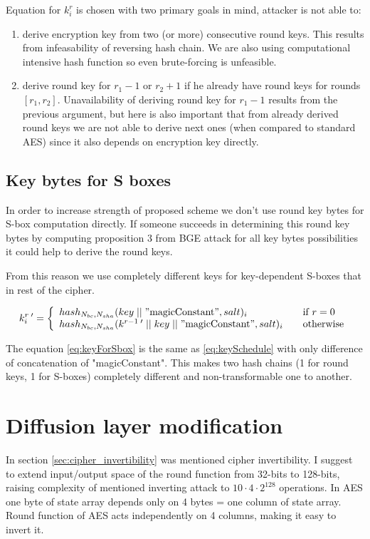 \documentclass[11pt,oneside,final]{fithesis2}
\begin{document}
    Equation for $k_i^r$ is chosen with two primary goals in mind, attacker is not able to:
    \begin{enumerate}
     \item derive encryption key from two (or more) consecutive round keys. This results from infeasability of reversing hash chain. 
	We are also using computational intensive hash function so even brute-forcing is unfeasible.
     \item derive round key for $r_1-1$ or $r_2+1$ if he already have round keys for rounds $[r_1, r_2]$. Unavailability of deriving 
	round key for $r_1-1$ results from the previous argument, but here is also important that from already derived round keys we are not able to derive 	
	next ones (when compared to standard AES) since it also depends on encryption key directly.
    \end{enumerate}
    
    \subsection{Key bytes for S boxes}
    In order to increase strength of proposed scheme we don't use round key bytes for S-box computation directly. If someone succeeds in determining 
    this round key bytes by computing proposition 3 from BGE attack for all key bytes possibilities it could help to derive the round keys.
    
    From this reason we use completely different keys for key-dependent S-boxes that in rest of the cipher.

    \begin{equation}\label{eq:keyForSbox}
    k_i^{r \; \prime} = \left\{ 
    \begin{array}{l l} 
	hash_{N_{bc}, N_{sha}}(key\; || \; "\text{magicConstant}", salt)_i                              & \quad \text{if $r=0$}\\
	hash_{N_{bc}, N_{sha}}(k^{r-1 \; \prime} \; || \; key \; || \; "\text{magicConstant}", salt)_i            & \quad \text{otherwise}
    \end{array} \right.
    \end{equation}
    
    The equation \ref{eq:keyForSbox} is the same as \ref{eq:keySchedule} with only difference of concatenation of "magicConstant". This makes 
    two hash chains (1 for round keys, 1 for S-boxes) completely different and non-transformable one to another.
   
    \section{Diffusion layer modification}\label{sec:cipher_invert_improvement}
    In section \ref{sec:cipher_invertibility} was mentioned cipher invertibility. I suggest to extend input/output space of the round function
    from 32-bits to 128-bits, raising complexity of mentioned inverting attack to $10\cdot4\cdot2^{128}$ operations. In AES one byte of state array depends
    only on 4 bytes = one column of state array. Round function of AES acts independently on 4 columns, making it easy to invert it. 
\end{document}
